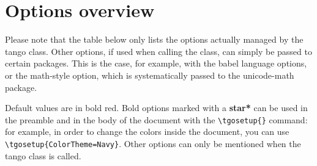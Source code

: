 \documentclass[english,ColorTheme=Red,FontSize=10pt]{tango}
\newcommand\TO[1]{\textsf{#1}}
\begin{document}
\section{Options overview}
Please note that the table below only lists the options actually managed by the tango class. Other options, if used when calling the class, can simply be passed to certain packages. This is the case, for example, with the babel language options, or the \TO{math-style} option, which is systematically passed to the \TO{unicode-math} package.

Default values are in bold red. Bold options marked with a \TO{\textbf{star*}} can be used in the preamble and in the body of the document with the \verb=\tgosetup{}= command: for example, in order to change the colors inside the document, you can use \verb+\tgosetup{ColorTheme=Navy}+. Other options can only be mentioned when the tango class is called.
\end{document}
